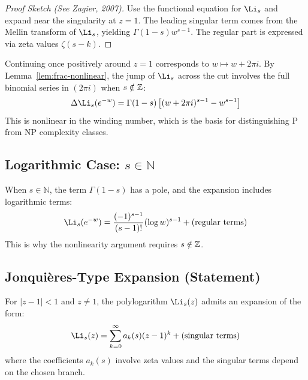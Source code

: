 \begin{proof}[Proof Sketch (See Zagier, 2007)]
Use the functional equation for $\Li_s$ and expand near the singularity at $z = 1$. The leading singular term comes from the Mellin transform of $\Li_s$, yielding $\Gamma(1-s) w^{s-1}$. The regular part is expressed via zeta values $\zeta(s-k)$.
\end{proof}

\begin{corollary}[Monodromy of $\Li_s$ Around $z = 1$]\label{cor:Li-monodromy}
Continuing once positively around $z = 1$ corresponds to $w \mapsto w + 2\pi i$. By Lemma~\ref{lem:frac-nonlinear}, the jump of $\Li_s$ across the cut involves the full binomial series in $(2\pi i)$ when $s \notin \mathbb{Z}$:
\begin{equation}
\Delta \Li_s(e^{-w}) = \Gamma(1-s) \left[ (w + 2\pi i)^{s-1} - w^{s-1} \right]
\end{equation}
This is nonlinear in the winding number, which is the basis for distinguishing P from NP complexity classes.
\end{corollary}

\subsection{Logarithmic Case: $s \in \mathbb{N}$}

\begin{remark}\label{rem:Li-integer}
When $s \in \mathbb{N}$, the term $\Gamma(1-s)$ has a pole, and the expansion includes logarithmic terms:
\begin{equation}
\Li_s(e^{-w}) = \frac{(-1)^{s-1}}{(s-1)!} (\log w)^{s-1} + \text{(regular terms)}
\end{equation}
This is why the nonlinearity argument requires $s \notin \mathbb{Z}$.
\end{remark}

\subsection{Jonquières-Type Expansion (Statement)}

\begin{theorem}\label{thm:jonquieres}
For $|z-1| < 1$ and $z \neq 1$, the polylogarithm $\Li_s(z)$ admits an expansion of the form:
\begin{equation}
\Li_s(z) = \sum_{k=0}^{\infty} a_k(s) (z-1)^k + \text{(singular terms)}
\end{equation}
where the coefficients $a_k(s)$ involve zeta values and the singular terms depend on the chosen branch.
\end{theorem}

